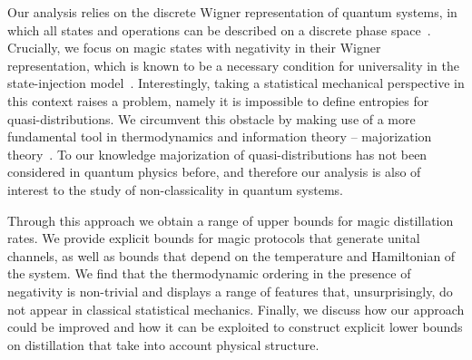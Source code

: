 \documentclass[pra,
aps,
twocolumn,
superscriptaddress,
groupedaddress,
nofootinbib,
reprint
]{revtex4-1}
\begin{document}
Our analysis relies on the discrete Wigner representation of quantum systems, in which all states and operations can be described on a discrete phase space~\cite{Ferrie_2008, Okay_2021}. Crucially, we focus on magic states with negativity in their Wigner representation, which is known to be a necessary condition for universality in the state-injection model~\cite{cit:veitch, cit:mari, cit:gottesman, cit:knill, Campbell_2011}. Interestingly, taking a statistical mechanical perspective in this context raises a problem, namely it is impossible to define entropies for quasi-distributions. We circumvent this obstacle by making use of a more fundamental tool in thermodynamics and information theory -- majorization theory~\cite{cit:marshall, Veinott_1971, Ruch_1976}. To our knowledge majorization of quasi-distributions has not been considered in quantum physics before, and therefore our analysis is also of interest to the study of non-classicality in quantum systems.

Through this approach we obtain a range of upper bounds for magic distillation rates. We provide explicit bounds for magic protocols that generate unital channels, as well as bounds that depend on the temperature and Hamiltonian of the system. We find that the thermodynamic ordering in the presence of negativity is non-trivial and displays a range of features that, unsurprisingly, do not appear in classical statistical mechanics. 
Finally, we discuss how our approach could be improved and how it can be exploited to construct explicit lower bounds on distillation that take into account physical structure.
\end{document}
